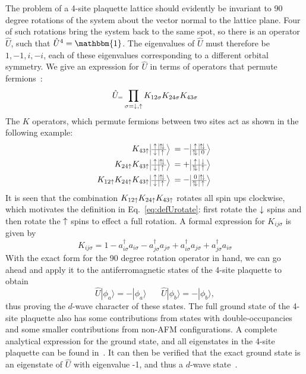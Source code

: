 The problem of a 4-site plaquette lattice should evidently be invariant to 90
degree rotations of the system about the vector normal to the lattice plane.
Four of such rotations bring the system back to the same spot, so there is an
operator $\hat{U}$, such that $\hat{U}^{4} =\mathbbm{ 1}$.  The eigenvalues of
$\hat{U}$ must therefore be $1,-1,i,-i$, each of these eigenvalues
corresponding to a different orbital symmetry.   We give an expression for
$\hat{U}$ in terms of operators that permute fermions~\cite{Gohmann1997}: 
\begin{equation} 
  \hat{U}_  = \prod_{\sigma =  \downarrow,  \uparrow } 
                K_{12\sigma} K_{24\sigma} K_{43\sigma}   
\label{eq:defUrotate}
\end{equation}
The $K$ operators, which  permute fermions between two sites act as shown in
the following example: 
\begin{align} 
  K_{43\spup}  \tbtwo{\spup}{\dbl}{\spdn}{\spup}   & = 
       -\tbtwo{\spup}{\dbl}{\dbl}{0} \\
  K_{24\spup}K_{43\spup} \tbtwo{\spup}{\dbl}{\spdn}{\spup} & = 
       +\tbtwo{\spup}{\spdn}{\dbl}{\spup} \\
  K_{12\spup}K_{24\spup}K_{43\spup} \tbtwo{\spup}{\dbl}{\spdn}{\spup} & = 
       -\tbtwo{0}{\dbl}{\dbl}{\spup} \\
\end{align} 
It is seen that the combination $K_{12 \uparrow }K_{24 \uparrow }K_{43 \uparrow }$ rotates all
spin ups clockwise,  which motivates the definition in Eq.~\ref{eq:defUrotate}:
first rotate the $ \downarrow$ spins and then rotate the $ \uparrow $ spins to effect a
full rotation.  A formal expression for $K_{ij\sigma}$ is given by 
\begin{equation}
  K_{ij\sigma} = 1 - a_{i\sigma}^{\dagger}a_{i\sigma} 
                   - a_{j\sigma}^{\dagger}a_{j\sigma} 
                   + a_{i\sigma}^{\dagger}a_{j\sigma} 
                   + a_{j\sigma}^{\dagger}a_{i\sigma} 
\end{equation}
With the exact form for the 90 degree rotation operator in hand, we can go ahead
and apply it to the antiferromagnetic states of the 4-site plaquette to obtain
\begin{equation} 
   \hat{U} | \phi_{a} \rangle = - | \phi_{a}  \rangle
   ~~~~~~~~
   \hat{U} | \phi_{b} \rangle = - | \phi_{b}  \rangle,
\end{equation} 
thus proving the $d$-wave character of these states. The full ground state of
the 4-site plaquette also has some contributions from states with
double-occupancies and some smaller contributions from non-AFM configurations.
A complete analytical expression for the ground state, and all eigenstates in
the 4-site plaquette can be found in~\cite{Schumman2008arxiv}.  It can then be
verified that the exact ground state is an eigenstate of $\hat{U}$ with
eigenvalue -1, and thus a $d$-wave state~\cite{Schumman2008arxiv}.

